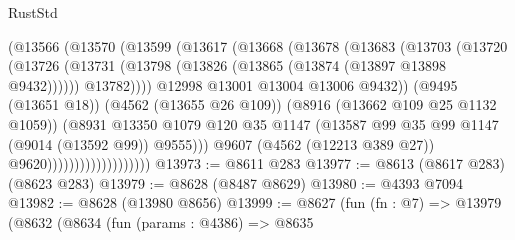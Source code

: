 \begin{lexlean}{RustStd}
\begin{coremodule}
                                    (@13566
                                      (@13570
                                        (@13599
                                          (@13617
                                            (@13668
                                              (@13678
                                                (@13683
                                                  (@13703
                                                    (@13720
                                                      (@13726
                                                        (@13731
                                                          (@13798
                                                            (@13826
                                                              (@13865
                                                                (@13874 (@13897 @13898 @9432))))))
                                                        @13782))))
                                                @12998
                                                @13001
                                                @13004
                                                @13006
                                                @9432))
                                            (@9495 (@13651 @18))
                                            (@4562 (@13655 @26 @109))
                                            (@8916 (@13662 @109 @25 @1132 @1059))
                                            (@8931
                                              @13350
                                              @1079
                                              @120
                                              @35
                                              @1147
                                              (@13587
                                                @99
                                                @35
                                                @99
                                                @1147
                                                (@9014 (@13592 @99))
                                                @9555)))
                                          @9607
                                          (@4562 (@12213 @389 @27))
                                          @9620)))))))))))))))))))
@13973 := @8611 @283
@13977 := @8613 (@8617 @283) (@8623 @283)
@13979 := @8628 (@8487 @8629)
@13980 := @4393 @7094
@13982 := @8628 (@13980 @8656)
@13999 := @8627
    (fun (fn : @7) =>
    @13979
      (@8632
        (@8634
          (fun (params : @4386) =>
          @8635

\end{coremodule}
\end{lexlean}
